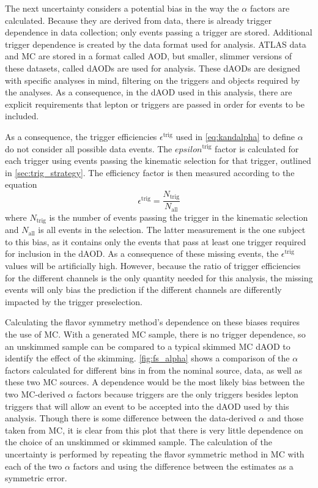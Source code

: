 The next uncertainty considers a potential bias in the way the $\alpha$ factors are calculated. Because they are derived from data, there is already trigger dependence in data collection; only events passing a trigger are stored. Additional trigger dependence is created by the data format used for analysis. \ac{ATLAS} data and \ac{MC} are stored in a format called \ac{AOD}, but smaller, slimmer versions of these datasets, called \acp{dAOD} are used for analysis. These \acp{dAOD} are designed with specific analyses in mind, filtering on the triggers and objects required by the analyses. As a consequence, in the \ac{dAOD} used in this analysis, there are explicit requirements that lepton or \met triggers are passed in order for events to be included. 

As a consequence, the trigger efficiencies $\epsilon^\text{trig}$ used in \autoref{eq:kandalpha} to define $\alpha$ do not consider all possible data events. The $epsilon^\text{trig}$ factor is calculated for each trigger using events passing the kinematic selection for that trigger, outlined in \autoref{sec:trig_strategy}. The efficiency factor is then measured according to the equation
%
\begin{equation}
\epsilon^\text{trig} = \frac{N_\text{trig}}{N_\text{all}} 
\end{equation}
%
where $N_\text{trig}$ is the number of events passing the trigger in the kinematic selection and $N_\text{all}$ is all events in the selection. The latter measurement is the one subject to this bias, as it contains only the events that pass at least one trigger required for inclusion in the \ac{dAOD}. As a consequence of these missing events, the $\epsilon^\text{trig}$ values will be artificially high. However, because the ratio of trigger efficiencies for the different channels is the only quantity needed for this analysis, the missing events will only bias the prediction if the different channels are differently impacted by the trigger preselection.

Calculating the flavor symmetry method's dependence on these biases requires the use of \ac{MC}. With a generated \ac{MC} sample, there is no trigger dependence, so an unskimmed sample can be compared to a typical skimmed \ac{MC} \ac{dAOD} to identify the effect of the skimming. \autoref{fig:fs_alpha} shows a comparison of the $\alpha$ factors calculated for different bins in \met from the nominal source, data, as well as these two \ac{MC} sources. A \met dependence would be the most likely bias between the two \ac{MC}-derived $\alpha$ factors because \met triggers are the only triggers besides lepton triggers that will allow an event to be accepted into the dAOD used by this analysis. Though there is some difference between the data-derived $\alpha$ and those taken from \ac{MC}, it is clear from this plot that there is very little dependence on the choice of an unskimmed or skimmed sample. The calculation of the uncertainty is performed by repeating the flavor symmetric method in \ac{MC} with each of the two $\alpha$ factors and using the difference between the estimates as a symmetric error.

